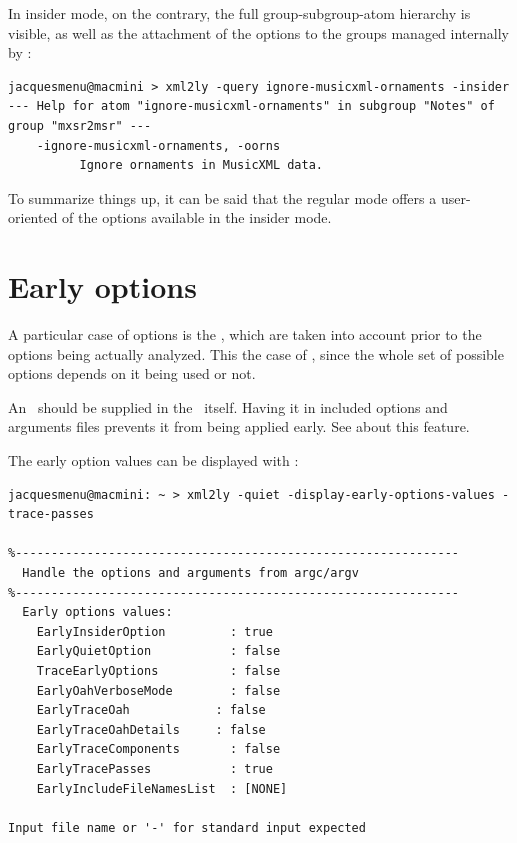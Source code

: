 In insider mode, on the contrary, the full group-subgroup-atom hierarchy is visible, as well as the attachment of the options to the groups managed internally by \mf:
\begin{lstlisting}[language=Terminal]
jacquesmenu@macmini > xml2ly -query ignore-musicxml-ornaments -insider
--- Help for atom "ignore-musicxml-ornaments" in subgroup "Notes" of group "mxsr2msr" ---
    -ignore-musicxml-ornaments, -oorns
          Ignore ornaments in MusicXML data.
\end{lstlisting}

To summarize things up, it can be said that the regular mode offers a user-oriented  of the options available in the insider mode.


\section{Early options}

A particular case of options is the , which are taken into account prior to the options being actually analyzed.
This the case of , since the whole set of possible options depends on it being used or not.

An \earlyOption\ should be supplied in the \CLI\ itself. Having it in included options and arguments files prevents it from being applied early. See  about this feature.

The early option values can be displayed with :
\begin{lstlisting}[language=Terminal]
jacquesmenu@macmini: ~ > xml2ly -quiet -display-early-options-values -trace-passes

%--------------------------------------------------------------
  Handle the options and arguments from argc/argv
%--------------------------------------------------------------
  Early options values:
    EarlyInsiderOption         : true
    EarlyQuietOption           : false
    TraceEarlyOptions          : false
    EarlyOahVerboseMode        : false
    EarlyTraceOah            : false
    EarlyTraceOahDetails     : false
    EarlyTraceComponents       : false
    EarlyTracePasses           : true
    EarlyIncludeFileNamesList  : [NONE]

Input file name or '-' for standard input expected
\end{lstlisting}


